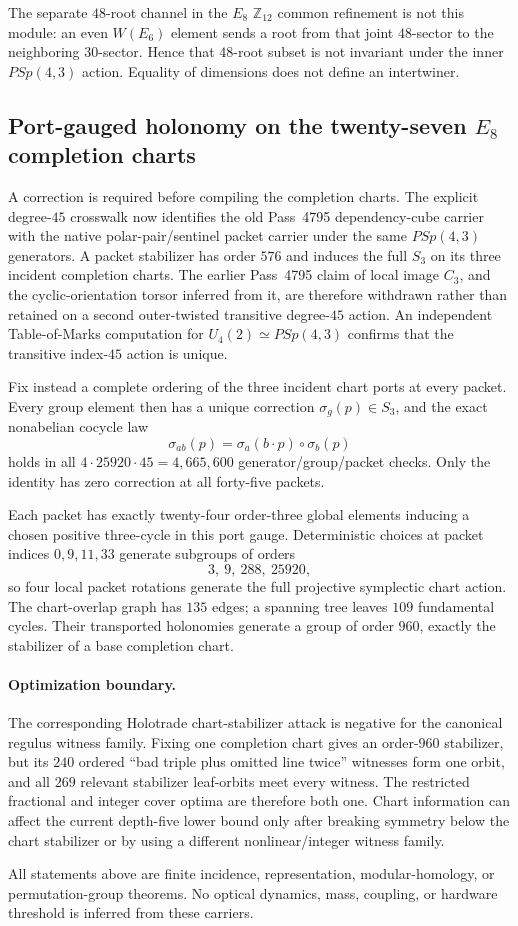 The separate $48$-root channel in the $E_8$ $\mathbb Z_{12}$ common refinement
is not this module: an even $W(E_6)$ element sends a root from that joint
$48$-sector to the neighboring $30$-sector.  Hence that $48$-root subset is
not invariant under the inner $PSp(4,3)$ action.  Equality of dimensions does
not define an intertwiner.

\subsection{Port-gauged holonomy on the twenty-seven $E_8$ completion charts}
\label{sec:20260901-chart-port-holonomy}

A correction is required before compiling the completion charts.  The explicit
degree-$45$ crosswalk now identifies the old Pass~4795 dependency-cube carrier
with the native polar-pair/sentinel packet carrier under the same
$PSp(4,3)$ generators.  A packet stabilizer has order $576$ and induces the
full $S_3$ on its three incident completion charts.  The earlier Pass~4795
claim of local image $C_3$, and the cyclic-orientation torsor inferred from it,
are therefore withdrawn rather than retained on a second outer-twisted
transitive degree-$45$ action.  An independent Table-of-Marks computation for
$U_4(2)\simeq PSp(4,3)$ confirms that the transitive index-$45$ action is
unique.

Fix instead a complete ordering of the three incident chart ports at every
packet.  Every group element then has a unique correction
$\sigma_g(p)\in S_3$, and the exact nonabelian cocycle law
\[
 \boxed{\sigma_{ab}(p)=\sigma_a(b\cdot p)\circ\sigma_b(p)}
\]
holds in all $4\cdot25920\cdot45=4{,}665{,}600$ generator/group/packet checks.
Only the identity has zero correction at all forty-five packets.

Each packet has exactly twenty-four order-three global elements inducing a
chosen positive three-cycle in this port gauge.  Deterministic choices at
packet indices $0,9,11,33$ generate subgroups of orders
\[
 3,\ 9,\ 288,\ 25920,
\]
so four local packet rotations generate the full projective symplectic chart
action.  The chart-overlap graph has $135$ edges; a spanning tree leaves $109$
fundamental cycles.  Their transported holonomies generate a group of order
$960$, exactly the stabilizer of a base completion chart.

\paragraph{Optimization boundary.}
The corresponding Holotrade chart-stabilizer attack is negative for the
canonical regulus witness family.  Fixing one completion chart gives an
order-$960$ stabilizer, but its $240$ ordered
``bad triple plus omitted line twice'' witnesses form one orbit, and all $269$
relevant stabilizer leaf-orbits meet every witness.  The restricted fractional
and integer cover optima are therefore both one.  Chart information can affect
the current depth-five lower bound only after breaking symmetry below the
chart stabilizer or by using a different nonlinear/integer witness family.

All statements above are finite incidence, representation, modular-homology,
or permutation-group theorems.  No optical dynamics, mass, coupling, or
hardware threshold is inferred from these carriers.
